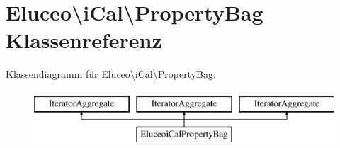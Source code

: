 \hypertarget{class_eluceo_1_1i_cal_1_1_property_bag}{}\section{Eluceo\textbackslash{}i\+Cal\textbackslash{}Property\+Bag Klassenreferenz}
\label{class_eluceo_1_1i_cal_1_1_property_bag}
Klassendiagramm für Eluceo\textbackslash{}i\+Cal\textbackslash{}Property\+Bag\+:\begin{figure}[H]
\begin{center}
\leavevmode
\includegraphics[height=2.000000cm]{class_eluceo_1_1i_cal_1_1_property_bag}
\end{center}
\end{figure}

